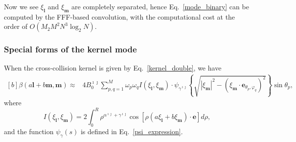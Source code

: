 Now we see $\xi_\textbf{l}$ and $\xi_\textbf{m}$ are completely separated, hence Eq.~\eqref{mode_binary} can be computed by the FFF-based convolution, with the computational cost at the order of $O(M_2M^2N^3\log_2N)$. 


\subsubsection{Special forms of the kernel mode}

When the cross-collision kernel is given by Eq.~\eqref{kernel_double}, we have 
\begin{equation}\label{kernel_mode_binary}
\begin{aligned}[b]
\beta(a\textbf{l}+b\textbf{m},\textbf{m})
    \approx&{4B_0^{\imath\jmath}}\sum_{p,q=1}^{M}\omega_p\omega_q
I(\xi_\textbf{l},\xi_\textbf{m})\cdot
    \psi_{\gamma^{\imath\jmath}}
    \left\{\sqrt{|\xi_\textbf{m}|^2-(\xi_\textbf{m}\cdot{\textbf{e}}_{\theta_p,\varphi_q})^2}
    \right \}\sin\theta_p,
\end{aligned}
\end{equation}
where
\begin{equation}\label{phi_expression_binary}
 I(\xi_\textbf{l},\xi_\textbf{m})=2\int_{0}^R\rho^{\alpha^{\imath\jmath}+\gamma^{\imath\jmath}}\cos[\rho(a\xi_\textbf{l}+b\xi_\textbf{m})\cdot{\textbf{e}}]d\rho,
\end{equation}
and the function $\psi_{\gamma}(s)$ is defined in Eq.~\eqref{psi_expression}. 

%

